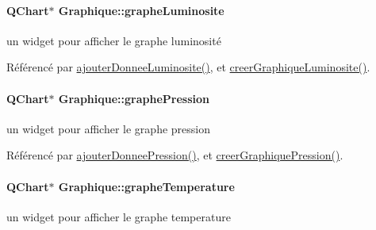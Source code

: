 \paragraph[{\texorpdfstring{graphe\+Luminosite}{grapheLuminosite}}]{\setlength{\rightskip}{0pt plus 5cm}Q\+Chart$\ast$ Graphique\+::graphe\+Luminosite\hspace{0.3cm}{\ttfamily [private]}}\hypertarget{class_graphique_adbed6be47df503c9a260586b0d93f5c4}{}\label{class_graphique_adbed6be47df503c9a260586b0d93f5c4}
un widget pour afficher le graphe luminosité 

Référencé par \hyperlink{class_graphique_a1af0e1968998cb7b5ee8add1197cb0e0}{ajouter\+Donnee\+Luminosite()}, et \hyperlink{class_graphique_a3b55b9c4732856e1b25bef167c25ac4c}{creer\+Graphique\+Luminosite()}.

\paragraph[{\texorpdfstring{graphe\+Pression}{graphePression}}]{\setlength{\rightskip}{0pt plus 5cm}Q\+Chart$\ast$ Graphique\+::graphe\+Pression\hspace{0.3cm}{\ttfamily [private]}}\hypertarget{class_graphique_afbf5d79803c4395cd5526891e1fc313f}{}\label{class_graphique_afbf5d79803c4395cd5526891e1fc313f}
un widget pour afficher le graphe pression 

Référencé par \hyperlink{class_graphique_a289f0631e56465012511fd7ec9da1b23}{ajouter\+Donnee\+Pression()}, et \hyperlink{class_graphique_adc50b5ae7a54dd576c99e74ec6bf74c5}{creer\+Graphique\+Pression()}.

\paragraph[{\texorpdfstring{graphe\+Temperature}{grapheTemperature}}]{\setlength{\rightskip}{0pt plus 5cm}Q\+Chart$\ast$ Graphique\+::graphe\+Temperature\hspace{0.3cm}{\ttfamily [private]}}\hypertarget{class_graphique_ad2fe81a972ee10a20a56300a87a78f24}{}\label{class_graphique_ad2fe81a972ee10a20a56300a87a78f24}
un widget pour afficher le graphe temperature 

